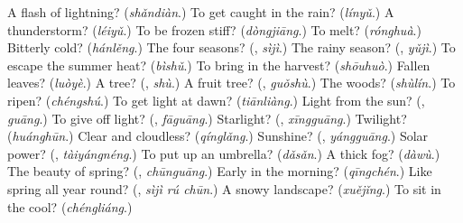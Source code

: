 \begin{tcolorbox}[breakable,colback=teal!4,colframe=teal!35!black,title={Before you move on}]
A flash of lightning? (\emph{shǎndiàn}.) To get caught in the rain? (\emph{línyǔ}.) A thunderstorm? (\emph{léiyǔ}.) To be frozen stiff? (\emph{dòngjiāng}.) To melt? (\emph{rónghuà}.) Bitterly cold? (\emph{hánlěng}.) The four seasons? (\textbf{}, \emph{sìjì}.) The rainy season? (\textbf{}, \emph{yǔjì}.) To escape the summer heat? (\emph{bìshǔ}.) To bring in the harvest? (\emph{shōuhuò}.) Fallen leaves? (\emph{luòyè}.) A tree? (\textbf{}, \emph{shù}.) A fruit tree? (\textbf{}, \emph{guǒshù}.) The woods? (\emph{shùlín}.) To ripen? (\emph{chéngshú}.) To get light at dawn? (\emph{tiānliàng}.) Light from the sun? (\textbf{}, \emph{guāng}.) To give off light? (\textbf{}, \emph{fāguāng}.) Starlight? (\textbf{}, \emph{xīngguāng}.) Twilight? (\emph{huánghūn}.) Clear and cloudless? (\emph{qínglǎng}.) Sunshine? (\textbf{}, \emph{yángguāng}.) Solar power? (\textbf{}, \emph{tàiyángnéng}.) To put up an umbrella? (\emph{dǎsǎn}.) A thick fog? (\emph{dàwù}.) The beauty of spring? (\textbf{}, \emph{chūnguāng}.) Early in the morning? (\emph{qīngchén}.) Like spring all year round? (\textbf{}, \emph{sìjì rú chūn}.) A snowy landscape? (\emph{xuějǐng}.) To sit in the cool? (\emph{chéngliáng}.)
\end{tcolorbox}
